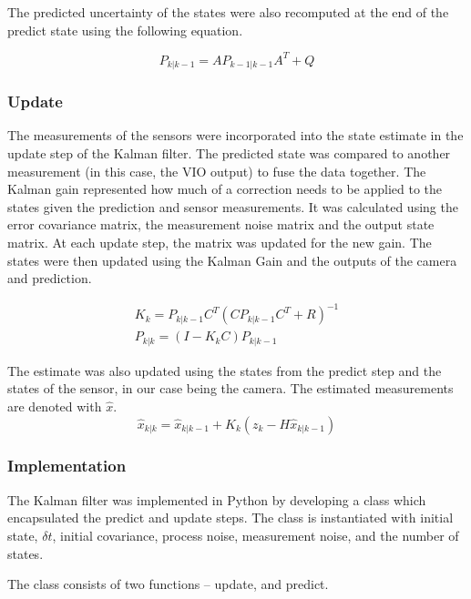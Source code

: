 \documentclass[bare_jrnl_transmag]{subfiles}
\begin{document}
The predicted uncertainty of the states were also recomputed at the end of the predict state using the following equation.

\begin{equation*}
    P_{k|k-1} = A P_{k-1|k-1} A^T + Q
\end{equation*}
\newline

\subsubsection{Update}
The measurements of the sensors were incorporated into the state estimate in the update step of the Kalman filter. The predicted state was compared to another measurement (in this case, the VIO output) to fuse the data together. 
The Kalman gain represented how much of a correction needs to be applied to the states given the prediction and sensor measurements. It was calculated using the error covariance matrix, the measurement noise matrix and the output state matrix. 
At each update step, the matrix was updated for the new gain. The states were then updated using the Kalman Gain and the outputs of the camera and prediction.

\begin{eqnarray*}
    K_k = P_{k|k-1} C^T (C P_{k|k-1} C^T + R)^{-1} \\[1em]
    P_{k|k} = (I - K_k C) P_{k|k-1}
\end{eqnarray*}

The estimate was also updated using the states from the predict step and the states of the sensor, in our case being the camera. 
The estimated measurements are denoted with $\hat{x}$. 
\begin{equation*}
    \hat{x}_{k|k} = \hat{x}_{k|k-1} + K_k (z_k - H \hat{x}_{k|k-1})
\end{equation*}
\newline

\subsubsection{Implementation}

The Kalman filter was implemented in Python by developing a class which encapsulated the predict and update steps. The class is instantiated with initial state, $\delta t$, initial covariance, process noise, measurement noise, and the number of states. 

The class consists of two functions -- update, and predict.\newline
\end{document}
